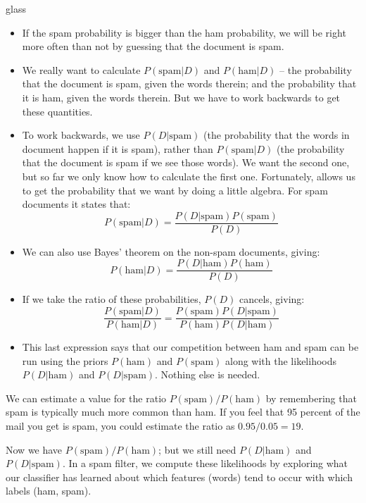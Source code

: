 \begin{tblsfilledsymbol}{}{glass}
\begin{underthehood}
\begin{itemize}

\item  If the spam probability is bigger than the ham probability, 
	we will be right more often than not by guessing that the document is spam.
	
\item We really want to calculate \(P(\mbox{spam}|D)\) and \(P(\mbox{ham}|D)\) -- the probability that the document is spam, given the words therein; and the probability that it is ham, given the words therein.  But we have to work backwards to get these quantities.


	\item To work backwards, we use \(P(D|\mbox{spam})\)  (the probability that the words in document happen if it is spam), rather than 
	 \(P(\mbox{spam}|D)\) (the probability that the document is spam if we see those words). We want the
	second one, but so far we only know how to calculate the first one.
	Fortunately,  allows us to get the probability that we want by doing a little
	algebra. For spam documents it states that:
\[
	   P(\mbox{spam}|D) = \frac{P(D|\mbox{spam})P(\mbox{spam})}{P(D)}
    \]
	\item We can also use Bayes' theorem on the non-spam documents, giving:
	\[
	   P(\mbox{ham}|D) = \frac{P(D|\mbox{ham})P(\mbox{ham})}{P(D)}
	\]
	\item If we take the ratio of these probabilities, \(P(D)\) cancels, giving:
	\[
	   \frac{P(\mbox{spam}|D)}{P(\mbox{ham}|D)} =  \frac{P(\mbox{spam})P(D|\mbox{spam})}{P(\mbox{ham})P(D|\mbox{ham})}
	\]
      \item This last expression says that our competition between ham
        and spam can be run using the priors \(P(\mbox{ham})\) and
        \(P(\mbox{spam})\) along with the likelihoods \(P(D|\mbox{ham})\) and
        \(P(D|\mbox{spam})\). Nothing else is needed.
        \end{itemize}

We can estimate a value for the ratio \(P(\mbox{spam})/P(\mbox{ham})\) by
remembering that spam is typically much more common than ham. If you
feel that 95 percent of the mail you get is spam, you could estimate the
ratio as \(0.95/0.05 = 19\).

Now we have \(P(\mbox{spam})/P(\mbox{ham})\); but we still need  \(P(D|\mbox{ham})\) and
        \(P(D|\mbox{spam})\).   In a spam filter, we compute these likelihoods by exploring what our classifier has learned about which features (words) tend to occur with which labels (ham, spam). 


\end{underthehood}
\end{tblsfilledsymbol}
